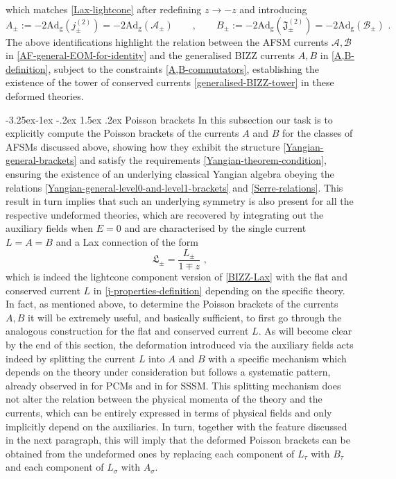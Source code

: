 \documentclass[12pt]{article}
\makeatletter
\renewcommand\subsection{\@startsection{subsection}{2}{\z@}%
                                     {-3.25ex\@plus -1ex \@minus -.2ex}%
                                     {1.5ex \@plus .2ex}%
                                     {\normalfont\bfseries}}
\numberwithin{equation}{section}
\makeatother
\begin{document}
which matches \eqref{Lax-lightcone} after redefining $z\rightarrow-z$ and introducing
\begin{equation}\label{A,B-AF-SSSM}
A_{\pm}:=-2\mathrm{Ad}_{\mathrm{g}}(j_{\pm}^{(2)})=-2\mathrm{Ad}_{\mathrm{g}}(\mathcal{A}_{\pm})
\qquad , \qquad 
B_{\pm}:=-2\mathrm{Ad}_{\mathrm{g}}(\mathfrak{J}_{\pm}^{(2)})=-2\mathrm{Ad}_{\mathrm{g}}(\mathcal{B}_{\pm}) \,\, .
\end{equation}
The above identifications highlight the relation between the AFSM currents $\mathcal{A},\mathcal{B}$ in \eqref{AF-general-EOM-for-identity} and the generalised BIZZ currents $A,B$ in \eqref{A,B-definition}, subject to the constraints \eqref{A,B-commutators}, establishing the existence of the tower of conserved currents \eqref{generalised-BIZZ-tower} in these deformed theories.




\subsection{Poisson brackets}
In this subsection our task is to explicitly compute the Poisson brackets of the currents $A$ and $B$ for the classes of AFSMs discussed above, showing how they exhibit the structure \eqref{Yangian-general-brackets} and satisfy the requirements \eqref{Yangian-theorem-condition}, ensuring the existence of an underlying classical Yangian algebra obeying the relations \eqref{Yangian-general-level0-and-level1-brackets} and \eqref{Serre-relations}. This result in turn implies that such an underlying symmetry is also present for all the respective undeformed theories, which are recovered by integrating out the auxiliary fields when $E=0$ and are characterised by the single current $L=A=B$ and a Lax connection of the form 
\begin{equation}\label{Lax-undeformed-models}
\mathfrak{L}_{\pm}=\frac{L_{\pm}}{1\mp z} \,\, ,
\end{equation}
which is indeed the lightcone component version of \eqref{BIZZ-Lax} with the flat and conserved current $L$ in \eqref{j-properties-definition} depending on the specific theory.
In fact, as mentioned above, to determine the Poisson brackets of the currents $A,B$ it will be extremely useful, and basically sufficient, to first go through the analogous construction for the flat and conserved current $L$. As will become clear by the end of this section, the deformation introduced via the auxiliary fields acts indeed by splitting the current $L$ into $A$ and $B$ with a specific mechanism which depends on the theory under consideration but follows a systematic pattern, already observed in \cite{Ferko:2024ali} for PCMs and in \cite{Cesaro:2024ipq} for SSSM. This splitting mechanism does not alter the relation between the physical momenta of the theory and the currents, which can be entirely expressed in terms of physical fields and only implicitly depend on the auxiliaries. In turn, together with the feature discussed in the next paragraph, this will imply that the deformed Poisson brackets can be obtained from the undeformed ones by replacing each component of $L_{\tau}$ with $B_{\tau}$ and each component of $L_{\sigma}$ with $A_{\sigma}$. 
\end{document}

